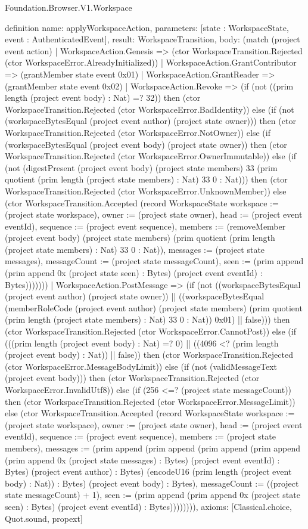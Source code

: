 \begin{lexlean}{Foundation.Browser.V1.Workspace}
\begin{semanticmodule}
definition{
  name: applyWorkspaceAction,
  parameters: [state : WorkspaceState, event : AuthenticatedEvent],
  result: WorkspaceTransition,
  body: (match (project event action)
    | WorkspaceAction.Genesis => (ctor WorkspaceTransition.Rejected (ctor WorkspaceError.AlreadyInitialized))
    | WorkspaceAction.GrantContributor => (grantMember state event 0x01)
    | WorkspaceAction.GrantReader => (grantMember state event 0x02)
    | WorkspaceAction.Revoke => (if (not ((prim length (project event body) : Nat) =? 32)) then (ctor WorkspaceTransition.Rejected (ctor WorkspaceError.BadIdentity)) else (if (not (workspaceBytesEqual (project event author) (project state owner))) then (ctor WorkspaceTransition.Rejected (ctor WorkspaceError.NotOwner)) else (if (workspaceBytesEqual (project event body) (project state owner)) then (ctor WorkspaceTransition.Rejected (ctor WorkspaceError.OwnerImmutable)) else (if (not (digestPresent (project event body) (project state members) 33 (prim quotient (prim length (project state members) : Nat) 33 0 : Nat))) then (ctor WorkspaceTransition.Rejected (ctor WorkspaceError.UnknownMember)) else (ctor WorkspaceTransition.Accepted (record WorkspaceState {workspace := (project state workspace), owner := (project state owner), head := (project event eventId), sequence := (project event sequence), members := (removeMember (project event body) (project state members) (prim quotient (prim length (project state members) : Nat) 33 0 : Nat)), messages := (project state messages), messageCount := (project state messageCount), seen := (prim append (prim append 0x (project state seen) : Bytes) (project event eventId) : Bytes)}))))))
    | WorkspaceAction.PostMessage => (if (not ((workspaceBytesEqual (project event author) (project state owner)) || ((workspaceBytesEqual (memberRoleCode (project event author) (project state members) (prim quotient (prim length (project state members) : Nat) 33 0 : Nat)) 0x01) || false))) then (ctor WorkspaceTransition.Rejected (ctor WorkspaceError.CannotPost)) else (if (((prim length (project event body) : Nat) =? 0) || ((4096 <? (prim length (project event body) : Nat)) || false)) then (ctor WorkspaceTransition.Rejected (ctor WorkspaceError.MessageBodyLimit)) else (if (not (validMessageText (project event body))) then (ctor WorkspaceTransition.Rejected (ctor WorkspaceError.InvalidUtf8)) else (if (256 <=? (project state messageCount)) then (ctor WorkspaceTransition.Rejected (ctor WorkspaceError.MessageLimit)) else (ctor WorkspaceTransition.Accepted (record WorkspaceState {workspace := (project state workspace), owner := (project state owner), head := (project event eventId), sequence := (project event sequence), members := (project state members), messages := (prim append (prim append (prim append (prim append (prim append 0x (project state messages) : Bytes) (project event eventId) : Bytes) (project event author) : Bytes) (encodeU16 (prim length (project event body) : Nat)) : Bytes) (project event body) : Bytes), messageCount := ((project state messageCount) + 1), seen := (prim append (prim append 0x (project state seen) : Bytes) (project event eventId) : Bytes)}))))))),
  axioms: [Classical.choice, Quot.sound, propext]
}


\end{semanticmodule}
\end{lexlean}
